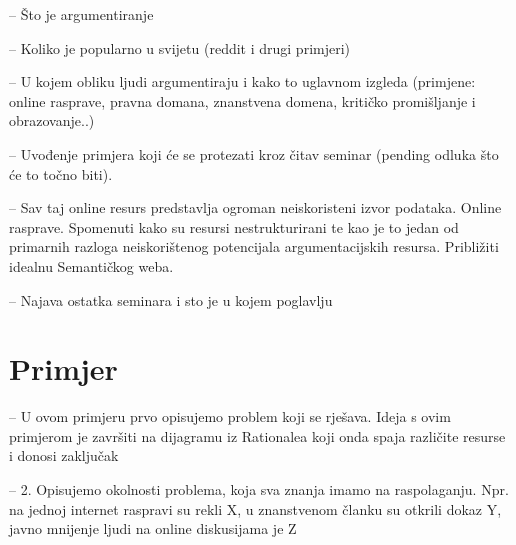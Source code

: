 -- Što je argumentiranje

-- Koliko je popularno u svijetu (reddit i drugi primjeri)

-- U kojem obliku ljudi argumentiraju i kako to uglavnom izgleda (primjene: 
online rasprave, pravna domana, znanstvena domena, kritičko promišljanje i
obrazovanje..)

-- Uvođenje primjera koji će se protezati kroz čitav seminar (pending odluka
što će to točno biti). 

-- Sav taj online resurs predstavlja ogroman neiskoristeni izvor podataka.
Online rasprave. Spomenuti kako su resursi nestrukturirani te kao je to jedan
od primarnih razloga neiskorištenog potencijala argumentacijskih resursa. 
Približiti idealnu Semantičkog weba. 

-- Najava ostatka seminara i sto je u kojem poglavlju

\section{Primjer}

-- U ovom primjeru prvo opisujemo problem koji se rješava. Ideja s ovim
primjerom je završiti na dijagramu iz Rationalea koji onda spaja različite
resurse i donosi zaključak

-- 2. Opisujemo okolnosti problema, koja sva znanja imamo na raspolaganju. 
Npr. na jednoj internet raspravi su rekli X, u znanstvenom članku su otkrili
dokaz Y, javno mnijenje ljudi na online diskusijama je Z

